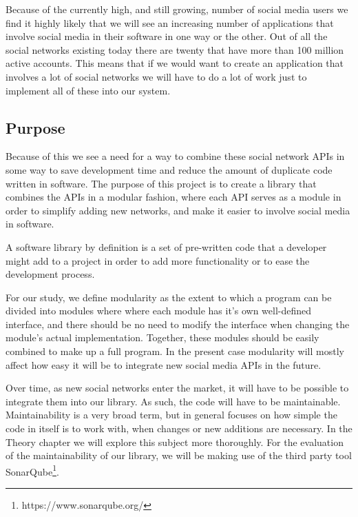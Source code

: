 \documentclass{sigchi-alternate}
\begin{document}
Because of the currently high, and still growing, number of social media users we find it highly likely that we will see an increasing number of
applications that involve social media in their software in one way or the other. Out of all the social networks existing today there are twenty
that have more than 100 million active accounts\autocite{STATISTA_LEADING_SOCIAL_NETWORKS}. This means that if we would want to create an application
that involves a lot of social networks we will have to do a lot of work just to implement all of these into our system.

\subsection{Purpose}
Because of this we see a need for a way to combine these social network APIs in some way to save development
time and reduce the amount of duplicate code written in software. The purpose of this project is to create a library 
that combines the APIs in a modular fashion, where each API serves as a module in order to simplify adding new networks,
and make it easier to involve social media in software. 

A software library by definition is a set of pre-written code that a developer might add to a project in order to add more functionality or to ease the 
development process\autocite{TLDP_LIBRARY_DEFINITION}. 

For our study, we define modularity as the extent to which a program can be divided into modules where\autocite{Kiczales:2005:APM:1062455.1062482}
where each module has it's own well-defined interface, and there should be no need to modify the interface when changing the module's actual implementation.
Together, these modules should be easily combined to make up a full program. In the present case modularity will mostly affect how easy it will be to integrate
new social media APIs in the future.


Over time, as new social networks enter the market, it will have to be possible to integrate them into our library. As such, the code will have to be maintainable.
Maintainability is a very broad term, but in general focuses on how simple the code in itself is to work with, when changes or new additions are necessary.
In the Theory chapter we will explore this subject more thoroughly. For the evaluation of the maintainability of our library, we will be making use of the third
party tool SonarQube\footnote{https://www.sonarqube.org/}.
\end{document}
